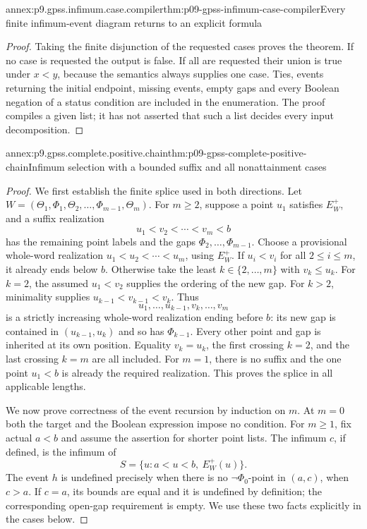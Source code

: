 \begin{annexitem}{annex:p9.gpss.infimum.case.compiler}{thm:p09-gpss-infimum-case-compiler}{Every finite infimum-event diagram returns to an explicit formula}
\begin{proof}
Taking the finite disjunction of the requested cases
proves the theorem. If no case is requested the output
is false. If all are requested their union is true
under \(x<y\), because the semantics always supplies
one case. Ties, events returning the initial endpoint,
missing events, empty gaps and every Boolean negation
of a status condition are included in the enumeration.
The proof compiles a given list; it has not asserted
that such a list decides every input decomposition.
\end{proof}
\end{annexitem}

\begin{annexitem}{annex:p9.gpss.complete.positive.chain}{thm:p09-gpss-complete-positive-chain}{Infimum selection with a bounded suffix and all nonattainment cases}
\begin{proof}
We first establish the finite splice used in both directions.
Let \(W=(\Theta_1,\Phi_1,\Theta_2,\ldots,\Phi_{m-1},\Theta_m)\).
For \(m\geq2\), suppose a point \(u_1\) satisfies \(E^+_W\), and a
suffix realization
\[
                         u_1<v_2<\cdots<v_m<b
\]
has the remaining point labels and the gaps
\(\Phi_2,\ldots,\Phi_{m-1}\). Choose a provisional
whole-word realization
\(u_1<u_2<\cdots<u_m\), using \(E^+_W\).
If \(u_i<v_i\) for all \(2\leq i\leq m\), it
already ends below \(b\). Otherwise take the least
\(k\in\{2,\ldots,m\}\) with \(v_k\leq u_k\).
For \(k=2\), the assumed \(u_1<v_2\) supplies
the ordering of the new gap. For \(k>2\),
minimality supplies \(u_{k-1}<v_{k-1}<v_k\).
Thus
\[
              u_1,\ldots,u_{k-1},v_k,\ldots,v_m
\]
is a strictly increasing whole-word realization
ending before \(b\): its new gap is contained
in \((u_{k-1},u_k)\) and so has \(\Phi_{k-1}\).
Every other point and gap is inherited at its
own position. Equality \(v_k=u_k\), the first
crossing \(k=2\), and the last crossing \(k=m\)
are all included. For \(m=1\), there is no
suffix and the one point \(u_1<b\) is already
the required realization. This proves the
splice in all applicable lengths.

We now prove correctness of the event recursion
by induction on \(m\). At \(m=0\) both the
target and the Boolean expression impose no
condition. For \(m\geq1\), fix actual \(a<b\)
and assume the assertion for shorter point
lists. The infimum \(c\), if defined, is
the infimum of
\[
                   S=\{u:a<u<b,\ E^+_W(u)\}.
\]
The event \(h\) is undefined precisely when
there is no \(\neg\Phi_0\)-point in \((a,c)\),
when \(c>a\). If \(c=a\), its bounds are
equal and it is undefined by definition;
the corresponding open-gap requirement
is empty. We use these two facts explicitly
in the cases below.


\end{proof}
\end{annexitem}
